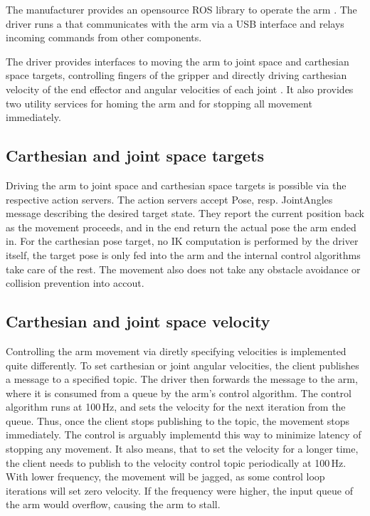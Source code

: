 \documentclass[buriama8_dp.tex]{subfiles}
\begin{document}
The manufacturer provides an opensource ROS library to operate the arm \cite{kinova_ros}. The driver runs a  that communicates with the arm via a USB interface and relays incoming commands from other components.

The driver provides interfaces to moving the arm to joint space and carthesian space targets, controlling fingers of the gripper and directly driving carthesian velocity of the end effector and angular velocities of each joint \cite{kinova_ros_api}. It also provides two utility services for homing the arm and for stopping all movement immediately.

\subsection{Carthesian and joint space targets}
\label{subsec:api_cart_action}

Driving the arm to joint space and carthesian space targets is possible via the respective action servers. The action servers accept Pose, resp. JointAngles message describing the desired target state. They report the current position back as the movement proceeds, and in the end return the actual pose the arm ended in. For the carthesian pose target, no IK computation is performed by the driver itself, the target pose is only fed into the arm and the internal control algorithms take care of the rest. The movement also does not take any obstacle avoidance or collision prevention into accout. 

\subsection{Carthesian and joint space velocity}
\label{subsec:api_cart_vel}

Controlling the arm movement via diretly specifying velocities is implemented quite differently. To set carthesian or joint angular velocities, the client publishes a message to a specified topic. The driver then forwards the message to the arm, where it is consumed from a queue by the arm's control algorithm. The control algorithm runs at 100\,Hz, and sets the velocity for the next iteration from the queue. Thus, once the client stops publishing to the topic, the movement stops immediately. The control is arguably implementd this way to minimize latency of stopping any movement. It also means, that to set the velocity for a longer time, the client needs to publish to the velocity control topic periodically at 100\,Hz. With lower frequency, the movement will be jagged, as some control loop iterations will set zero velocity. If the frequency were higher, the input queue of the arm would overflow, causing the arm to stall.
\end{document}
